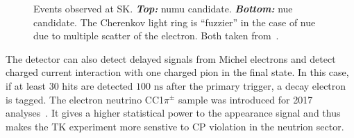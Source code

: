 \begin{figure}[ht]
  \center
  \caption[Events observed at SK]{Events observed at
    \Gls{SK}. \textbf{\textit{Top:}} \gls{numu}
    candidate. \textbf{\textit{Bottom:}} \gls{nue} candidate. The
    Cherenkov light ring is ``fuzzier'' in the case of \gls{nue} due
    to multiple scatter of the electron. Both taken
    from~\cite{T2K2011}.}
  \label{fig:cherenkov}
\end{figure}

The detector can also detect delayed signals from Michel electrons and
detect charged current interaction with one charged pion in the final
state. In this case, if at least $30$ hits are detected
$100\text{~ns}$ after the primary trigger, a decay electron is
tagged. The electron neutrino \Gls{CC}1$\pi^\pm$ sample was introduced
for 2017 analyses~\cite{LastT2K}. It gives a higher statistical power
to the appearance signal and thus makes the \Gls{TK} experiment more
senstive to \Gls{CP} violation in the neutrion sector.





